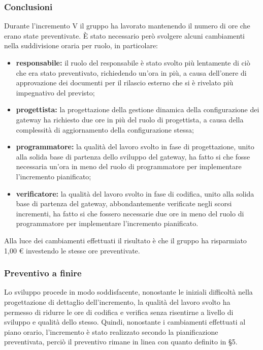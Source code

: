 		\subsubsection{Conclusioni}
			Durante l'incremento V il gruppo ha lavorato mantenendo il numero di ore che erano state preventivate. È stato necessario però svolgere alcuni cambiamenti nella suddivisione oraria per ruolo, in particolare:
			\begin{itemize}
				\item \textbf{responsabile:} il ruolo del responsabile è stato svolto più lentamente di ciò che era stato preventivato, richiedendo un'ora in più, a causa dell'onere di approvazione dei documenti per il rilascio esterno che si è rivelato più impegnativo del previsto;
				\item \textbf{progettista:} la progettazione della gestione dinamica della configurazione dei gateway ha richiesto due ore in più del ruolo di progettista, a causa della complessità di aggiornamento della configurazione stessa;
				\item \textbf{programmatore:} la qualità del lavoro svolto in fase di progettazione, unito alla solida base di partenza dello sviluppo del gateway, ha fatto si che fosse necessaria un'ora in meno del ruolo di programmatore per implementare l'incremento pianificato;
				\item \textbf{verificatore:} la qualità del lavoro svolto in fase di codifica, unito alla solida base di partenza del gateway, abbondantemente verificate negli scorsi incrementi, ha fatto si che fossero necessarie due ore in meno del ruolo di programmatore per implementare l'incremento pianificato.
			\end{itemize}
			Alla luce dei cambiamenti effettuati il risultato è che il gruppo ha risparmiato 1,00 € investendo le stesse ore preventivate.
		
		\subsubsection{Preventivo a finire}
			Lo sviluppo procede in modo soddisfacente, nonostante le iniziali difficoltà nella progettazione di dettaglio dell'incremento, la qualità del lavoro svolto ha permesso di ridurre le ore di codifica e verifica senza risentirne a livello di sviluppo e qualità dello stesso.
			\newline
			Quindi, nonostante i cambiamenti effettuati al piano orario, l'incremento è stato realizzato secondo la pianificazione preventivata, perciò il preventivo rimane in linea con quanto definito in \S5.
			

